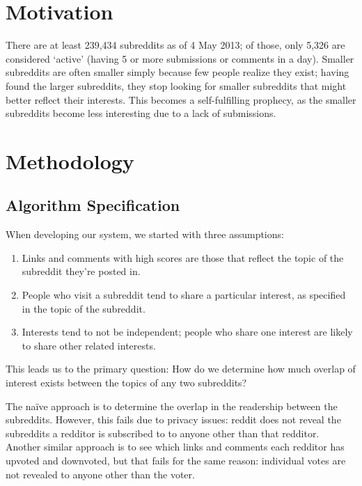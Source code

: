 \documentclass[journal, draftclsnofoot]{./styles/IEEEtran}
\begin{document}
\section{Motivation}

There are at least 239,434 subreddits as of 4 May 2013\cite{metareddit};
of those, only 5,326 are considered `active' (having 5 or more
submissions or comments in a day)\cite{reddit-aboutreddit}. Smaller
subreddits are often smaller simply because few people realize they
exist; having found the larger subreddits, they stop looking for smaller
subreddits that might better reflect their interests. This becomes a
self-fulfilling prophecy, as the smaller subreddits become less
interesting due to a lack of submissions.

\section{Methodology}

\subsection{Algorithm Specification}

When developing our system, we started with three assumptions:

\begin{enumerate}

\item Links and comments with high scores are those that reflect the
topic of the subreddit they're posted in.

\item People who visit a subreddit tend to share a particular interest,
as specified in the topic of the subreddit.

\item Interests tend to not be independent; people who share one
interest are likely to share other related interests.

\end{enumerate}

This leads us to the primary question: How do we determine how much
overlap of interest exists between the topics of any two subreddits?

The na\"i{}ve approach is to determine the overlap in the readership
between the subreddits. However, this fails due to privacy issues:
reddit does not reveal the subreddits a redditor is subscribed to to
anyone other than that redditor. Another similar approach is to see
which links and comments each redditor has upvoted and downvoted, but
that fails for the same reason: individual votes are not revealed to
anyone other than the voter.
\end{document}
